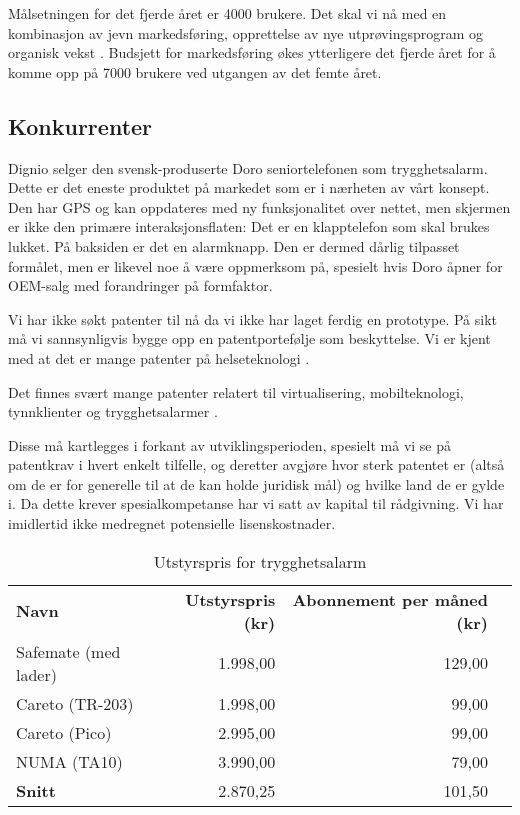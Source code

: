 Målsetningen for det fjerde året er 4000 brukere. Det skal vi nå med en
kombinasjon av jevn markedsføring, opprettelse av nye utprøvingsprogram og
organisk vekst \cite{bessant}.  Budsjett for markedsføring økes ytterligere det
fjerde året for å komme opp på 7000 brukere ved utgangen av det femte året.

\subsection{Konkurrenter}


Dignio selger den svensk-produserte Doro seniortelefonen som trygghetsalarm.
Dette er det eneste produktet på markedet som er i nærheten av vårt konsept.
Den har GPS og kan oppdateres med ny funksjonalitet over nettet, men skjermen
er ikke den primære interaksjonsflaten: Det er en klapptelefon som skal brukes
lukket. På baksiden er det en alarmknapp.  Den er dermed dårlig tilpasset
formålet, men er likevel noe å være oppmerksom på, spesielt hvis Doro åpner for
OEM-salg med forandringer på formfaktor.

Vi har ikke søkt patenter til nå da vi ikke har laget ferdig en prototype. På
sikt må vi sannsynligvis bygge opp en patentportefølje som beskyttelse. Vi er
kjent med at det er mange patenter på helseteknologi \cite{slides.chery}.

Det finnes svært mange patenter relatert til virtualisering, mobilteknologi,
tynnklienter og trygghetsalarmer \cite{patent.ricordi2008mobile,
patent.heinz2013wearable}.

Disse må kartlegges i forkant av utviklingsperioden, spesielt må vi se på
patentkrav i hvert enkelt tilfelle, og deretter avgjøre hvor sterk patentet er
(altså om de er for generelle til at de kan holde juridisk mål) og hvilke land
de er gylde i. Da dette krever spesialkompetanse har vi satt av kapital til
rådgivning. Vi har imidlertid ikke medregnet potensielle lisenskostnader.

\begin{table}
  \centering
  \begin{tabular}{lrrr}
    \textbf{Navn} &
    \textbf{Utstyrspris (kr)} &
    \textbf{Abonnement per måned (kr)}\\
    Safemate (med lader) & 1.998,00 & 129,00 \\
    Careto (TR-203)      & 1.998,00 &  99,00 \\
    Careto (Pico)        & 2.995,00 &  99,00 \\
    NUMA (TA10)          & 3.990,00 &  79,00 \\
    \textbf{Snitt}       & 2.870,25 & 101,50 \\
  \end{tabular}
  \caption{Utstyrspris for trygghetsalarm}
  \label{table.konkurranse.pris}
\end{table}


